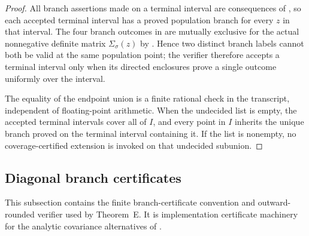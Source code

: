 \begin{proof}
All branch assertions made on a terminal interval are consequences of
, so each accepted
terminal interval has a proved population branch for every \(z\) in that
interval.  The four branch outcomes in
 are mutually exclusive for the
actual nonnegative definite matrix \(\Sigma_\sigma(z)\) by
.  Hence two distinct
branch labels cannot both be valid at the same population point; the verifier
therefore accepts a terminal interval only when its directed enclosures prove a
single outcome uniformly over the interval.

The equality of the endpoint union is a finite rational check in the transcript,
independent of floating-point arithmetic.  When the undecided list is empty,
the accepted terminal intervals cover all of \(I\), and every point in \(I\)
inherits the unique branch proved on the terminal interval containing it.  If
the list is nonempty, no coverage-certified extension is invoked on that
undecided subunion.
\end{proof}

\subsection{Diagonal branch certificates}\label{app:diagonal-branch-certificate-protocol-main}

This subsection contains the finite branch-certificate convention and
outward-rounded verifier used by Theorem~E.  It is implementation certificate
machinery for the analytic covariance alternatives of
.

